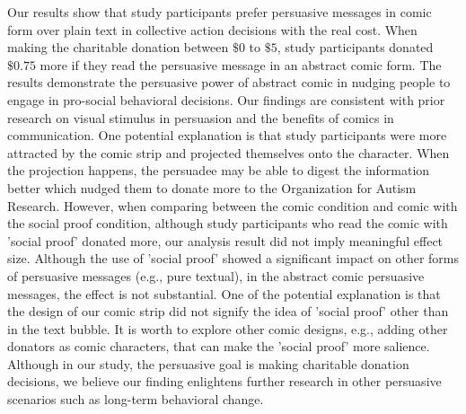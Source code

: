Our results show that study participants prefer persuasive messages in comic form over plain text in collective action decisions with the real cost. When making the charitable donation between $\$0$ to $\$5$, study participants donated $\$ 0.75$ more if they read the persuasive message in an abstract comic form. The results demonstrate the persuasive power of abstract comic in nudging people to engage in pro-social behavioral decisions. Our findings are consistent with prior research on visual stimulus in persuasion and the benefits of comics in communication. One potential explanation is that study participants were more attracted by the comic strip and projected themselves onto the character. When the projection happens, the persuadee may be able to digest the information better which nudged them to donate more to the  Organization for Autism Research. However, when comparing between the comic condition and comic with the social proof condition, although study participants who read the comic with 'social proof' donated more, our analysis result did not imply meaningful effect size. Although the use of 'social proof' showed a significant impact on other forms of persuasive messages (e.g., pure textual), in the abstract comic persuasive messages, the effect is not substantial. One of the potential explanation is that the design of our comic strip did not signify the idea of 'social proof' other than in the text bubble. It is worth to explore other comic designs, e.g., adding other donators as comic characters, that can make the 'social proof' more salience. Although in our study, the persuasive goal is making charitable donation decisions, we believe our finding enlightens further research in other persuasive scenarios such as long-term behavioral change.


